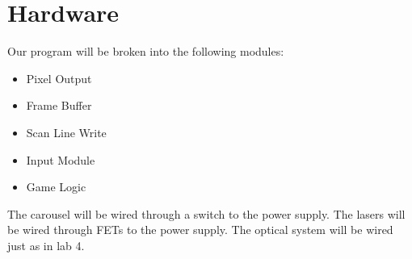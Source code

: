 \documentclass[10pt]{article}
\begin{document}
\section{Hardware}

Our program will be broken into the following modules:
\begin{itemize}
\item Pixel Output
\item Frame Buffer
\item Scan Line Write
\item Input Module
\item Game Logic
\end{itemize}

The carousel will be wired through a switch to the power supply.
The lasers will be wired through FETs to the power supply.
The optical system will be wired just as in lab 4.
\end{document}

